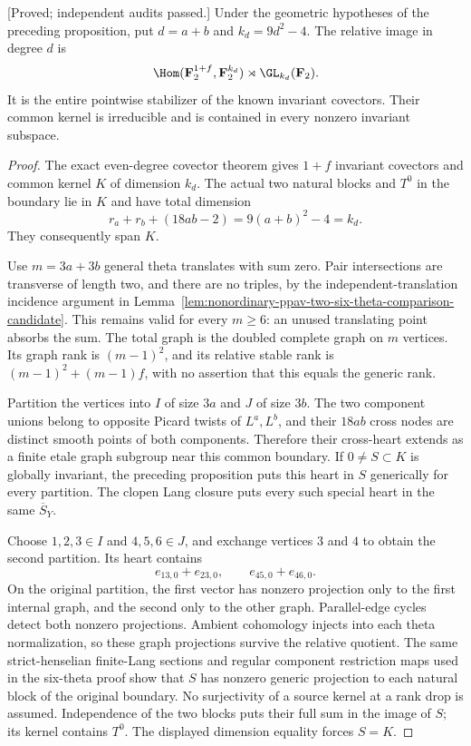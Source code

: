 \begin{theorem}
\label{thm:nonordinary-even-addition-candidate}
\textup{[Proved; independent audits passed.]}
Under the geometric hypotheses of the preceding proposition,
put $d=a+b$ and $k_d=9d^2-4$. The relative image in degree $d$ is
\[
       \Hom(\mathbf F_2^{1+f},\mathbf F_2^{k_d})
                               \rtimes\GL_{k_d}(\mathbf F_2).
\]
It is the entire pointwise stabilizer of the known invariant
covectors. Their common kernel is irreducible and is contained
in every nonzero invariant subspace.
\end{theorem}
\begin{proof}
The exact even-degree covector theorem gives $1+f$ invariant
covectors and common kernel $K$ of dimension $k_d$. The actual
two natural blocks and $T^0$ in the boundary lie in $K$ and
have total dimension
\[
       r_a+r_b+(18ab-2)=9(a+b)^2-4=k_d.
\]
They consequently span $K$.

Use $m=3a+3b$ general theta translates with sum zero. Pair
intersections are transverse of length two, and there are no
triples, by the independent-translation incidence argument in
Lemma~\ref{lem:nonordinary-ppav-two-six-theta-comparison-candidate}.
This remains valid for every $m\ge6$: an unused translating
point absorbs the sum. The total graph is the doubled complete
graph on $m$ vertices. Its graph rank is $(m-1)^2$, and its
relative stable rank is $(m-1)^2+(m-1)f$, with no assertion that
this equals the generic rank.

Partition the vertices into $I$ of size $3a$ and $J$ of size
$3b$. The two component unions belong to opposite Picard
twists of $L^a,L^b$, and their $18ab$ cross nodes are distinct
smooth points of both components. Therefore their cross-heart
extends as a finite etale graph subgroup near this common
boundary. If $0\ne S\subset K$ is globally invariant, the
preceding proposition puts this heart in $S$ generically for
every partition. The clopen Lang closure puts every such
special heart in the same $\overline S_Y$.

Choose $1,2,3\in I$ and $4,5,6\in J$, and exchange vertices
$3$ and $4$ to obtain the second partition. Its heart contains
\[
                  e_{13,0}+e_{23,0},\qquad
                  e_{45,0}+e_{46,0}.
\]
On the original partition, the first vector has nonzero
projection only to the first internal graph, and the second
only to the other graph. Parallel-edge cycles detect both
nonzero projections. Ambient cohomology injects into each
theta normalization, so these graph projections survive the
relative quotient. The same strict-henselian finite-Lang
sections and regular component restriction maps used in the
six-theta proof show that $S$ has nonzero generic projection
to each natural block of the original boundary. No surjectivity
of a source kernel at a rank drop is assumed. Independence
of the two blocks puts their full sum in the image of $S$;
its kernel contains $T^0$. The displayed dimension equality
forces $S=K$.


\end{proof}

